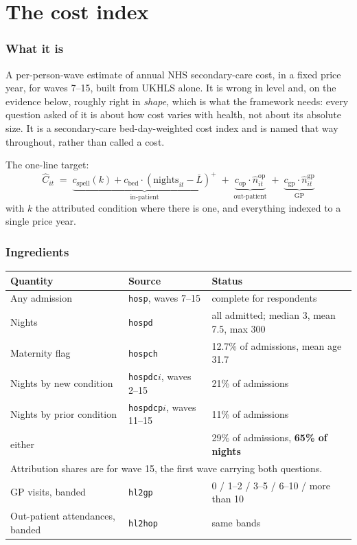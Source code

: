 \documentclass[11pt]{article}
\newcommand{\code}[1]{\texttt{\small #1}}
\begin{document}
\part{The cost index}

\section{What it is}
\label{sec:costwhat}

A per-person-wave estimate of annual NHS secondary-care cost, in a fixed price year, for waves 7--15, built from UKHLS alone. It is wrong in level and, on the evidence below, roughly right in \emph{shape}, which is what the framework needs: every question asked of it is about how cost varies with health, not about its absolute size. It is a secondary-care bed-day-weighted cost index and is named that way throughout, rather than called a cost.

The one-line target:
\[
  \widehat{C}_{it} \;=\;
  \underbrace{c_{\text{spell}}(k) + c_{\text{bed}} \cdot (\text{nights}_{it} - \bar{L})^{+}}_{\text{in-patient}}
  \;+\;
  \underbrace{c_{\text{op}} \cdot \widehat{n}^{\text{op}}_{it}}_{\text{out-patient}}
  \;+\;
  \underbrace{c_{\text{gp}} \cdot \widehat{n}^{\text{gp}}_{it}}_{\text{GP}}
\]
with $k$ the attributed condition where there is one, and everything indexed to a single price year.

\section{Ingredients}

\begin{center}\small
\begin{tabular}{llp{6.4cm}}
\toprule
Quantity & Source & Status \\
\midrule
Any admission & \code{hosp}, waves 7--15 & complete for respondents \\
Nights & \code{hospd} & all admitted; median 3, mean 7.5, max 300 \\
Maternity flag & \code{hospch} & 12.7\% of admissions, mean age 31.7 \\
Nights by new condition & \code{hospdc}$i$, waves 2--15 & 21\% of admissions \\
Nights by prior condition & \code{hospdcp}$i$, waves 11--15 & 11\% of admissions \\
\quad either & & 29\% of admissions, \textbf{65\% of nights} \\
\multicolumn{3}{l}{\footnotesize Attribution shares are for wave 15, the first wave carrying both questions.} \\
GP visits, banded & \code{hl2gp} & 0 / 1--2 / 3--5 / 6--10 / more than 10 \\
Out-patient attendances, banded & \code{hl2hop} & same bands \\
\bottomrule
\end{tabular}
\end{center}
\end{document}
